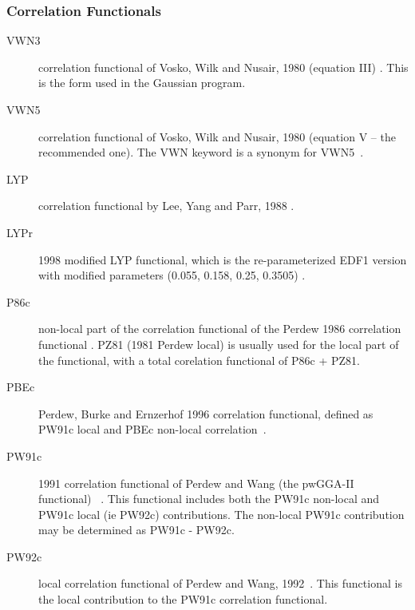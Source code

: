 \subsubsection{Correlation Functionals}
\providecommand\corfn[1]{#1}
\begin{description}

\item[VWN3] correlation functional of Vosko, Wilk and Nusair, 1980 (equation III) 
  \cite{dft:vwn}. This is the form used in the Gaussian program.

\item[VWN5] correlation functional of Vosko, Wilk and Nusair, 1980 (equation
  V -- the recommended one). The VWN keyword is a synonym for VWN5~\cite{dft:vwn}.


\item[LYP] correlation functional by Lee, Yang and Parr, 1988
  \cite{dft:lyp1,dft:lyp2}.

\item[LYPr] 1998 modified \corfn{LYP} functional, which is the re-parameterized EDF1 version 
  with modified parameters (0.055, 0.158, 0.25, 0.3505)
  \cite{dft:lyp1,dft:lyp2,dft:edf1}.

\item[P86c] non-local part of the correlation functional of the Perdew 1986 correlation functional
  \cite{dft:p86}. PZ81 (1981 Perdew local) is usually used for the local part of the
  functional, with a total corelation functional of 
  \corfn{P86c} + \corfn{PZ81}.

\item[PBEc] Perdew, Burke and Ernzerhof 1996 correlation functional, 
  defined as PW91c local and PBEc non-local correlation~\cite{dft:pbe}.

\item[PW91c] 1991 correlation functional of Perdew and Wang (the pwGGA-II functional)
  ~\cite{dft:pw91}. This functional includes both the PW91c non-local and 
  PW91c local (ie PW92c) contributions. The non-local PW91c contribution may be determined
  as \corfn{PW91c} - \corfn{PW92c}.

\item[PW92c] local correlation functional of Perdew and Wang, 1992~\cite{dft:pw91,dft:pw92}.
  This functional is the local contribution to the PW91c correlation functional.


\end{description}
